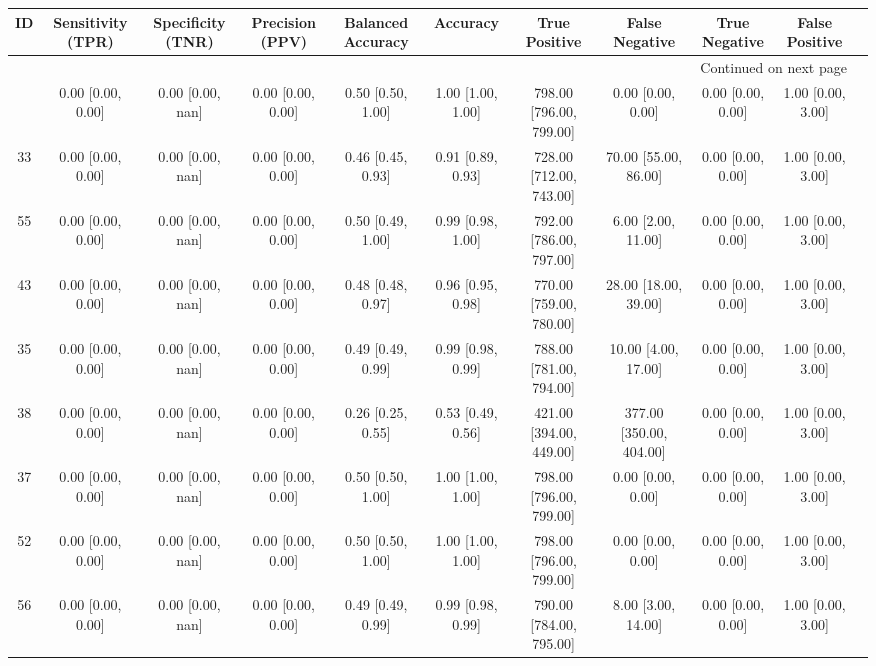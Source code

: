 \documentclass[8pt]{article}
\begin{document}
\begin{center}
\begin{footnotesize}
\begin{longtable}{|ccccccccccc|}
\toprule
 ID &  Sensitivity (TPR) & Specificity (TNR) &    Precision (PPV) &  Balanced Accuracy &           Accuracy &            True Positive &           False Negative &      True Negative &     False Positive \\
\midrule
\endhead
\midrule
\multicolumn{10}{r}{{Continued on next page}} \\
\midrule
\endfoot

\bottomrule
\endlastfoot
 44 &  0.00 [0.00, 0.00] &  0.00 [0.00, nan] &  0.00 [0.00, 0.00] &  0.50 [0.50, 1.00] &  1.00 [1.00, 1.00] &  798.00 [796.00, 799.00] &        0.00 [0.00, 0.00] &  0.00 [0.00, 0.00] &  1.00 [0.00, 3.00] \\
 33 &  0.00 [0.00, 0.00] &  0.00 [0.00, nan] &  0.00 [0.00, 0.00] &  0.46 [0.45, 0.93] &  0.91 [0.89, 0.93] &  728.00 [712.00, 743.00] &     70.00 [55.00, 86.00] &  0.00 [0.00, 0.00] &  1.00 [0.00, 3.00] \\
 55 &  0.00 [0.00, 0.00] &  0.00 [0.00, nan] &  0.00 [0.00, 0.00] &  0.50 [0.49, 1.00] &  0.99 [0.98, 1.00] &  792.00 [786.00, 797.00] &       6.00 [2.00, 11.00] &  0.00 [0.00, 0.00] &  1.00 [0.00, 3.00] \\
 43 &  0.00 [0.00, 0.00] &  0.00 [0.00, nan] &  0.00 [0.00, 0.00] &  0.48 [0.48, 0.97] &  0.96 [0.95, 0.98] &  770.00 [759.00, 780.00] &     28.00 [18.00, 39.00] &  0.00 [0.00, 0.00] &  1.00 [0.00, 3.00] \\
 35 &  0.00 [0.00, 0.00] &  0.00 [0.00, nan] &  0.00 [0.00, 0.00] &  0.49 [0.49, 0.99] &  0.99 [0.98, 0.99] &  788.00 [781.00, 794.00] &      10.00 [4.00, 17.00] &  0.00 [0.00, 0.00] &  1.00 [0.00, 3.00] \\
 38 &  0.00 [0.00, 0.00] &  0.00 [0.00, nan] &  0.00 [0.00, 0.00] &  0.26 [0.25, 0.55] &  0.53 [0.49, 0.56] &  421.00 [394.00, 449.00] &  377.00 [350.00, 404.00] &  0.00 [0.00, 0.00] &  1.00 [0.00, 3.00] \\
 37 &  0.00 [0.00, 0.00] &  0.00 [0.00, nan] &  0.00 [0.00, 0.00] &  0.50 [0.50, 1.00] &  1.00 [1.00, 1.00] &  798.00 [796.00, 799.00] &        0.00 [0.00, 0.00] &  0.00 [0.00, 0.00] &  1.00 [0.00, 3.00] \\
 52 &  0.00 [0.00, 0.00] &  0.00 [0.00, nan] &  0.00 [0.00, 0.00] &  0.50 [0.50, 1.00] &  1.00 [1.00, 1.00] &  798.00 [796.00, 799.00] &        0.00 [0.00, 0.00] &  0.00 [0.00, 0.00] &  1.00 [0.00, 3.00] \\
 56 &  0.00 [0.00, 0.00] &  0.00 [0.00, nan] &  0.00 [0.00, 0.00] &  0.49 [0.49, 0.99] &  0.99 [0.98, 0.99] &  790.00 [784.00, 795.00] &       8.00 [3.00, 14.00] &  0.00 [0.00, 0.00] &  1.00 [0.00, 3.00] \\
\end{longtable}
\end{footnotesize}
\end{center}
\end{document}

